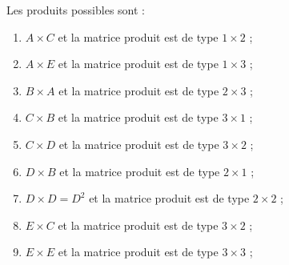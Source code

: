 {{ 	Les produits possibles sont :
 \begin{enumerate}
 	\item $A\times C$ et la matrice produit est de type $1 \times 2$ ;
 	\item $A\times E$ et la matrice produit est de type $1 \times 3$ ;
 	\item $B\times A$ et la matrice produit est de type $2 \times 3$ ;
 	\item $C \times B$ et la matrice produit est de type $3 \times 1$ ;
 	\item $C\times D$ et la matrice produit est de type $3 \times 2$ ;
 	\item $D \times B$ et la matrice produit est de type $2 \times 1$ ;
 	\item $D\times D = D^2$ et la matrice produit est de type $2 \times 2$ ;
 	\item $E \times C$ et la matrice produit est de type $3 \times 2$ ;
 	\item $E \times E$ et la matrice produit est de type $3 \times 3$ ;
 \end{enumerate}
  }}
